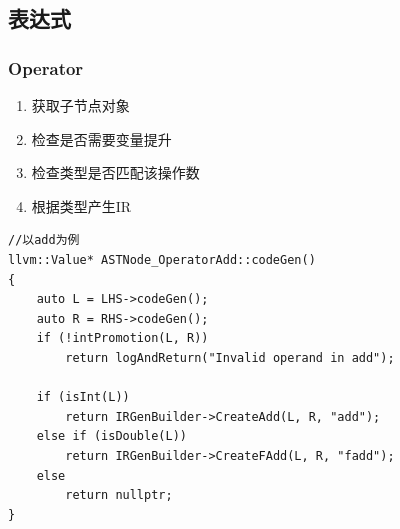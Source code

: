\documentclass{article}
\begin{document}
\subsection{表达式}
\subsubsection{Operator}
\begin{enumerate}
  \item 获取子节点对象
  \item 检查是否需要变量提升
  \item 检查类型是否匹配该操作数
  \item 根据类型产生IR
\end{enumerate}
\begin{lstlisting}
//以add为例
llvm::Value* ASTNode_OperatorAdd::codeGen()
{
    auto L = LHS->codeGen();
    auto R = RHS->codeGen();
    if (!intPromotion(L, R))
        return logAndReturn("Invalid operand in add");

    if (isInt(L))
        return IRGenBuilder->CreateAdd(L, R, "add");
    else if (isDouble(L))
        return IRGenBuilder->CreateFAdd(L, R, "fadd");
    else
        return nullptr;
}
\end{lstlisting}
\end{document}
